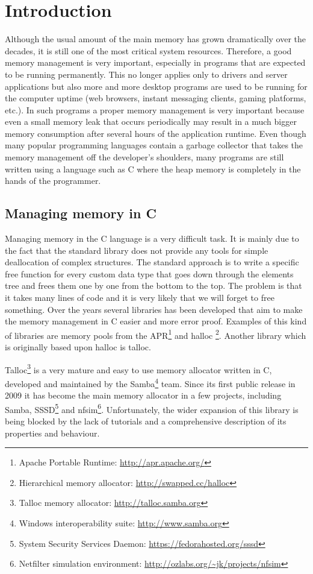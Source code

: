 \chapter{Introduction}

Although the usual amount of the main memory has grown dramatically over the
decades, it is still one of the most critical system resources. Therefore, a
good memory management is very important, especially in programs that are
expected to be running permanently. This no longer applies only to drivers and
server applications but also more and more desktop programs are used to be
running for the computer uptime (web browsers, instant messaging clients,
gaming platforms, etc.). In such programs a proper memory management is very
important because even a small memory leak that occurs periodically may result
in a much bigger memory consumption after several hours of the application
runtime. Even though many popular programming languages contain a garbage
collector that takes the memory management off the developer's shoulders, many
programs are still written using a language such as C where the heap memory is
completely in the hands of the programmer.

\section{Managing memory in C}

Managing memory in the C language is a very difficult task. It is mainly due to
the fact that the standard library does not provide any tools for simple
deallocation of complex structures. The standard approach is to write a
specific free function for every custom data type that goes down through the
elements tree and frees them one by one from the bottom to the top. The problem
is that it takes many lines of code and it is very likely that we will forget to
free something. Over the years several libraries has been developed that aim
to make the memory management in C easier and more error proof. Examples of this
kind of libraries are memory pools from the APR\footnote{Apache Portable
Runtime: \url{http://apr.apache.org/}} and halloc \footnote{Hierarchical
memory allocator: \url{http://swapped.cc/halloc}}. Another library which is originally
based upon halloc is talloc.

Talloc\footnote{Talloc memory allocator: \url{http://talloc.samba.org}} is a
very mature and easy to use memory allocator written in C, developed and
maintained by the Samba\footnote{Windows interoperability suite:
\url{http://www.samba.org}} team. Since its first public release in 2009 it has
become the main memory allocator in a few projects, including Samba,
SSSD\footnote{System Security Services Daemon:
\url{https://fedorahosted.org/sssd}} and nfsim\footnote{Netfilter simulation
environment: \url{http://ozlabs.org/~jk/projects/nfsim}}. Unfortunately, the
wider expansion of this library is being blocked by the lack of tutorials and a
comprehensive description of its properties and behaviour.

